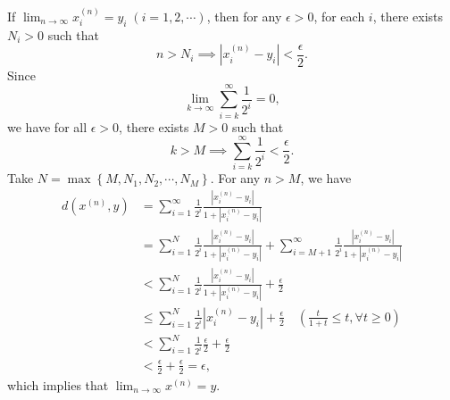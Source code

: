 \documentclass[12pt,letterpaper,boxed]{hmcpset}
\begin{document}
\begin{solution}
	If $\lim_{n\to\infty}x_i^{(n)}=y_i\;(i=1,2,\cdots)$, then for any $\epsilon>0$, for each $i$, there exists $N_i>0$ such that \[
		n>N_i\implies \left|x_i^{(n)}-y_i\right|<\frac{\epsilon}{2}.
	\]
	Since
	\[
		\lim_{k\to \infty}\sum_{i=k}^\infty\frac{1}{2^i}=0,
	\]
	we have for all $\epsilon>0$, there exists $M>0$ such that
	\[
		k>M\implies\sum_{i=k}^\infty\frac{1}{2^i}<\frac{\epsilon}{2}.
	\]
	Take $N=\max\left\{M,N_1,N_2,\cdots,N_M\right\}$. For any $n>M$, we have
	\begin{align*}
		d\left(x^{(n)},y\right)&=\sum_{i=1}^\infty\frac{1}{2^i}\frac{\left|x_i^{(n)}-y_i\right|}{1+\left|x_i^{(n)}-y_i\right|}\\
		&=\sum_{i=1}^N\frac{1}{2^i}\frac{\left|x_i^{(n)}-y_i\right|}{1+\left|x_i^{(n)}-y_i\right|}+\sum_{i=M+1}^\infty\frac{1}{2^i}\frac{\left|x_i^{(n)}-y_i\right|}{1+\left|x_i^{(n)}-y_i\right|}\\
		&<\sum_{i=1}^N\frac{1}{2^i}\frac{\left|x_i^{(n)}-y_i\right|}{1+\left|x_i^{(n)}-y_i\right|}+\frac{\epsilon}{2}\\
		&\le\sum_{i=1}^N\frac{1}{2^i}\left|x_i^{(n)}-y_i\right|+\frac{\epsilon}{2}\quad\left(\frac{t}{1+t}\le t,\forall t\ge0\right)\\
		&<\sum_{i=1}^N\frac{1}{2^i}\frac{\epsilon}{2}+\frac{\epsilon}{2}\\
		&<\frac{\epsilon}{2}+\frac{\epsilon}{2}=\epsilon,
	\end{align*}
	which implies that $\lim_{n\to\infty}x^{(n)}= y$.
\end{solution}
\end{document}

